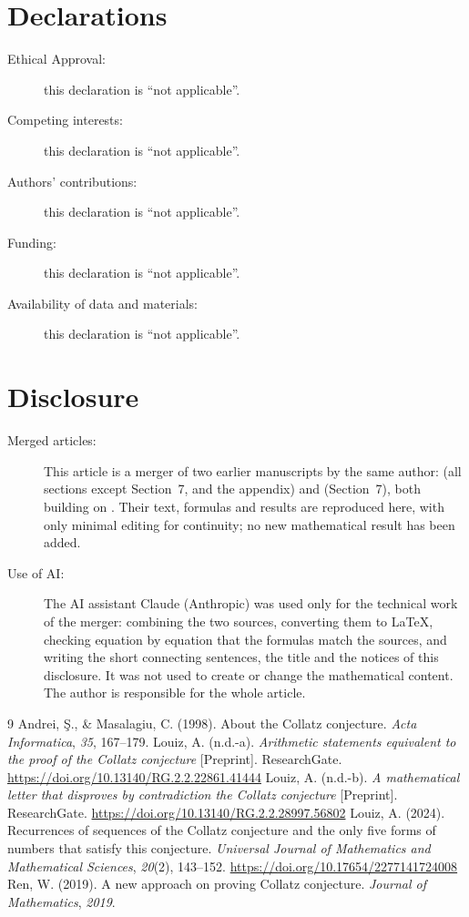\documentclass[11pt,a4paper]{article}
\theoremstyle{definition}
\begin{document}
\section*{Declarations}
\begin{description}
\item[Ethical Approval:] this declaration is ``not applicable''.
\item[Competing interests:] this declaration is ``not applicable''.
\item[Authors' contributions:] this declaration is ``not applicable''.
\item[Funding:] this declaration is ``not applicable''.
\item[Availability of data and materials:] this declaration is ``not applicable''.
\end{description}

\section*{Disclosure}
\begin{description}
\item[Merged articles:] This article is a merger of two earlier manuscripts by the same
author: \citet{LouizEquivalent} (all sections except Section~7, and the appendix) and
\citet{LouizLetter} (Section~7), both building on \citet{Louiz2024}. Their text, formulas and results are
reproduced here, with only minimal editing for continuity; no new mathematical result has
been added.
\item[Use of AI:] The AI assistant Claude (Anthropic) was used only for the technical work of
the merger: combining the two sources, converting them to \LaTeX, checking equation by
equation that the formulas match the sources, and writing the short connecting sentences,
the title and the notices of this disclosure. It was not used to create or change the
mathematical content. The author is responsible for the whole article.
\end{description}

\begin{thebibliography}{9}
Andrei, {\c S}., \& Masalagiu, C. (1998). About the Collatz conjecture.
\emph{Acta Informatica}, \emph{35}, 167--179.
Louiz, A. (n.d.-a). \emph{Arithmetic statements equivalent to the proof of the Collatz
conjecture} [Preprint]. ResearchGate. \url{https://doi.org/10.13140/RG.2.2.22861.41444}
Louiz, A. (n.d.-b). \emph{A mathematical letter that disproves by contradiction the Collatz
conjecture} [Preprint]. ResearchGate. \url{https://doi.org/10.13140/RG.2.2.28997.56802}
Louiz, A. (2024). Recurrences of sequences of the Collatz conjecture and the only five
forms of numbers that satisfy this conjecture. \emph{Universal Journal of Mathematics and
Mathematical Sciences}, \emph{20}(2), 143--152. \url{https://doi.org/10.17654/2277141724008}
Ren, W. (2019). A new approach on proving Collatz conjecture. \emph{Journal of
Mathematics}, \emph{2019}.
\end{thebibliography}
\end{document}
